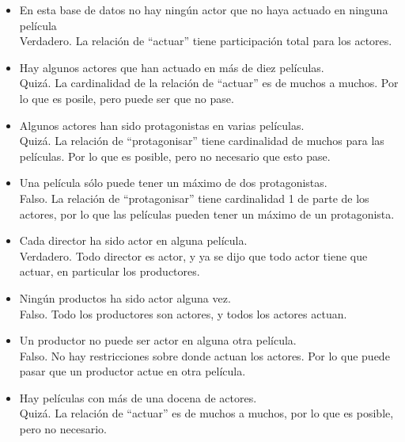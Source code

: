 \documentclass{article}
\begin{document}
    \begin{itemize}
        \item {
            En esta base de datos no hay ningún actor que no haya actuado en 
            ninguna película \\
            Verdadero. La relación de ``actuar'' tiene participación total para
            los actores.
        }
        \item {
            Hay algunos actores que han actuado en más de diez películas. \\
            Quizá. La cardinalidad de la relación de ``actuar'' es de muchos a 
            muchos. Por lo que es posile, pero puede ser que no pase.
        }
        \item {
            Algunos actores han sido protagonistas en varias películas. \\
            Quizá. La relación de ``protagonisar'' tiene cardinalidad de muchos
            para las películas. Por lo que es posible, pero no necesario que 
            esto pase.
        }
        \item {
            Una película sólo puede tener un máximo de dos protagonistas. \\
            Falso. La relación de ``protagonisar'' tiene cardinalidad 1 de parte 
            de los actores, por lo que las películas pueden tener un máximo de 
            un protagonista.
        }
        \item {
            Cada director ha sido actor en alguna película. \\
            Verdadero. Todo director es actor, y ya se dijo que todo actor tiene
            que actuar, en particular los productores.
        }
        \item {
            Ningún productos ha sido actor alguna vez. \\
            Falso. Todo los productores son actores, y todos los actores actuan.
        }
        \item {
            Un productor no puede ser actor en alguna otra película. \\
            Falso. No hay restricciones sobre donde actuan los actores. Por lo 
            que puede pasar que un productor actue en otra película.
        }
        \item {
            Hay películas con más de una docena de actores. \\
            Quizá. La relación de ``actuar'' es de muchos a muchos, por lo que 
            es posible, pero no necesario.
}
\end{itemize}
\end{document}
